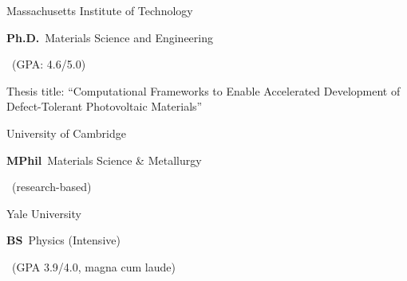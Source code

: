 	{Massachusetts Institute of Technology}
	{\textbf{Ph.D.}~Materials Science and Engineering
		\begin{footnotesize}
		~(GPA: 4.6/5.0)
        \end{footnotesize}}
	{Thesis title: ``Computational Frameworks to Enable Accelerated Development of Defect-Tolerant Photovoltaic Materials''}

\vspace{\edsep}
		{University of Cambridge}
		{\textbf{MPhil}~Materials Science \& Metallurgy
			\begin{footnotesize}
            ~(research-based)
            \end{footnotesize}}
		{}
		
\vspace{\edsep}	
		{Yale University}
		{\textbf{BS}~Physics (Intensive)
			\begin{footnotesize}
                ~(GPA 3.9/4.0, magna cum laude)
            \end{footnotesize}}
		{}
